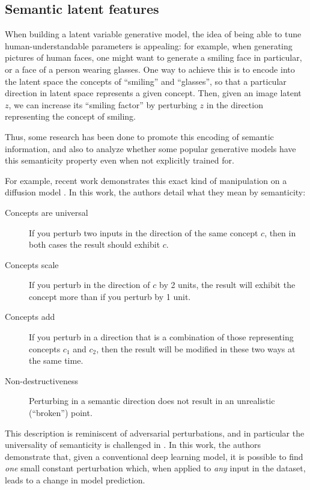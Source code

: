 \documentclass[../main.tex]{subfiles}
\begin{document}
\subsection{Semantic latent features}

When building a latent variable generative model, the idea of being able to tune human-understandable parameters is appealing: for example, when generating pictures of human faces, one might want to generate a smiling face in particular, or a face of a person wearing glasses.
One way to achieve this is to encode into the latent space the concepts of ``smiling'' and ``glasses'', so that a particular direction in latent space represents a given concept.
Then, given an image latent $z$, we can increase its ``smiling factor'' by perturbing $z$ in the direction representing the concept of smiling.

Thus, some research has been done to promote this encoding of semantic information, and also to analyze whether some popular generative models have this semanticity property even when not explicitly trained for.

For example, recent work demonstrates this exact kind of manipulation on a diffusion model \cite{kwonDiffusion2023}.
In this work, the authors detail what they mean by semanticity:
\begin{description}
	\item[Concepts are universal] If you perturb two inputs in the direction of the same concept $c$, then in both cases the result should exhibit $c$.
\item[Concepts scale] If you perturb in the direction of $c$ by 2 units, the result will exhibit the concept more than if you perturb by 1 unit.
\item[Concepts add] If you perturb in a direction that is a combination of those representing concepts $c_1$ and $c_2$, then the result will be modified in these two ways at the same time.
	\item[Non-destructiveness] Perturbing in a semantic direction does not result in an unrealistic (``broken'') point.
\end{description}

This description is reminiscent of adversarial perturbations, and in particular the universality of semanticity is challenged in \cite{moosavi-dezfooliUniversal2017}.
In this work, the authors demonstrate that, given a conventional deep learning model, it is possible to find \emph{one} small constant perturbation which, when applied to \emph{any} input in the dataset, leads to a change in model prediction.
\end{document}

